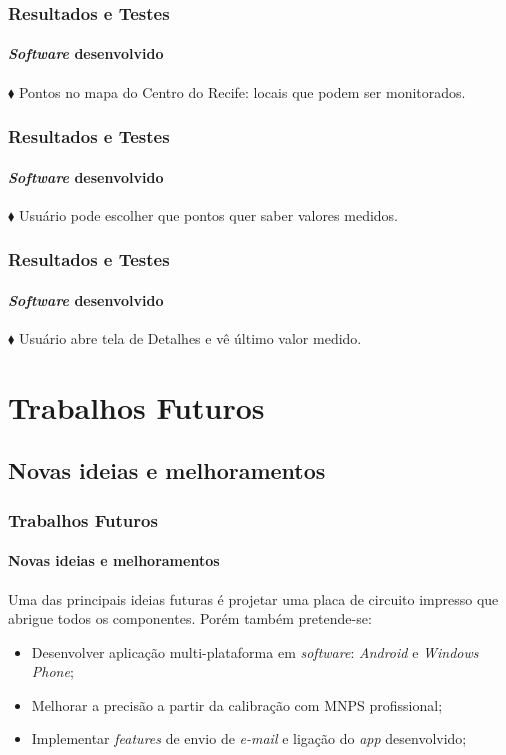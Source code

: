 \documentclass[brazil]{beamer}
\begin{document}
	\begin{frame}
		\frametitle{Resultados e Testes}
		\framesubtitle{{\it Software} desenvolvido}
		\footnotesize{$\blacklozenge$ Pontos no mapa do Centro do Recife: locais que podem ser monitorados.}
	\end{frame}

	\begin{frame}
		\frametitle{Resultados e Testes}
		\framesubtitle{{\it Software} desenvolvido}
		\begin{center}
			\footnotesize{$\blacklozenge$ Usuário pode escolher que pontos quer saber valores medidos.}
		\end{center}
	\end{frame}

		\begin{frame}
		\frametitle{Resultados e Testes}
		\framesubtitle{{\it Software} desenvolvido}
		\begin{center}
			\footnotesize{$\blacklozenge$ Usuário abre tela de Detalhes e vê último valor medido.}
		\end{center}
	\end{frame}


	\section{Trabalhos Futuros}

	\subsection{Novas ideias e melhoramentos}

	\begin{frame}
		\frametitle{Trabalhos Futuros}
		\framesubtitle{Novas ideias e melhoramentos}
		\footnotesize{Uma das principais ideias futuras é projetar uma placa de circuito impresso que abrigue todos os componentes. Porém também pretende-se:}
		\begin{itemize}
			\item Desenvolver aplicação multi-plataforma em {\it software}: {\it Android} e {\it Windows Phone};
			\item Melhorar a precisão a partir da calibração com MNPS profissional;
			\item Implementar {\it features} de envio de {\it e-mail} e ligação do {\it app} desenvolvido;
		\end{itemize}
	\end{frame}
\end{document}
